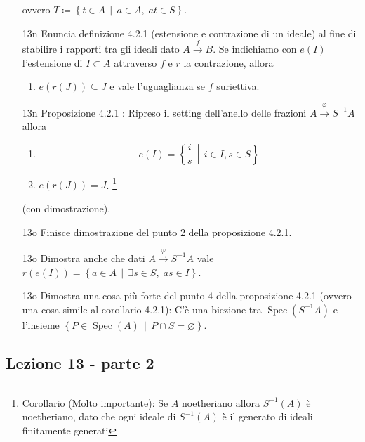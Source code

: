 \documentclass[italian]{article}
\begin{document}
\begin{enumerate}
         ovvero $T \coloneqq \left\{ t \in A \,\middle|\, a \in
         A, \; at \in S \right\}$.
       \item[13n] Enuncia definizione 4.2.1 \cite{vergura} (estensione
         e contrazione di un ideale) al fine di stabilire
         i rapporti tra gli ideali dato $A \xrightarrow{f} B$. Se indichiamo con
         $e(I)$ l'estensione di $I \subset A$ attraverso $f$ e $r$ la
         contrazione, allora
         \begin{enumerate}
           \item $e(r(J)) \subseteq J$ e vale l'uguaglianza se $f$ suriettiva.
         \end{enumerate}
       \item[13n] Proposizione 4.2.1 \cite{vergura}: Ripreso il setting dell'anello 
         delle frazioni $A \xrightarrow{\varphi} S^{-1}A$ allora
         \begin{enumerate}
           \item \begin{equation*}
               e(I) = \left\{ \frac{i}{s} \,\middle|\, i \in I, s\in S \right\}
             \end{equation*}
           \item $e(r(J)) = J$. \footnote{Corollario (Molto importante): Se 
               $A$ noetheriano allora $S^{-1}(A)$ è noetheriano, dato che 
               ogni ideale di $S^{-1}(A)$ è il generato di ideali finitamente 
             generati} 
         \end{enumerate}
         (con dimostrazione).
       \item[13o] Finisce dimostrazione del punto 2 della proposizione 4.2.1.
       \item[13o] Dimostra anche che dati $A \xrightarrow{\varphi} S^{-1}A$ vale
         $r(e(I)) = \left\{ a \in A \,\middle|\, \exists s \in S, \; as \in I 
         \right\}$.
       \item[13o] Dimostra una cosa più forte del punto $4$ della proposizione 
         4.2.1 (ovvero una cosa simile al corollario 4.2.1): C'è una biezione tra 
         $\operatorname{Spec}(S^{-1}A)$ e l'insieme
         $\left\{ P \in \operatorname{Spec}(A)\, \middle|\, P \cap
         S = \varnothing \right\}$.
	\end{enumerate}  

	\subsection{Lezione 13 - parte 2}
	
\end{document}
